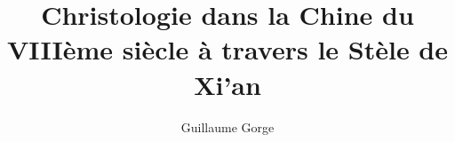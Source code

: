 \documentclass[oneside,10pt]{article}
\title{Christologie dans la Chine du VIIIème siècle à travers le Stèle de Xi’an}
\author{Guillaume Gorge}
\begin{document}
 


\maketitle





\setcounter{page}{1}
 



%
%


%
%
%

%
%

%
%
%


 

%
%

%
\begin{singlespace}

%
\end{singlespace}
\end{document}
